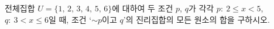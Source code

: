 전체집합 $U=\{1,\,2,\,3,\,4,\,5,\,6\}$에 대하여 두 조건 $p$, $q$가 각각 $p:\ 2\le x<5$, $q:\ 3<x\le 6$일 때, 조건 ‘$\sim p$이고 $q$’의 진리집합의 모든 원소의 합을 구하시오.
